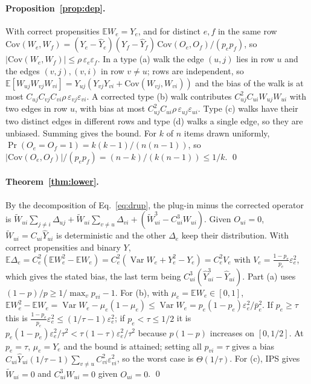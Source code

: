 \documentclass[preprint,review,12pt,authoryear]{elsarticle}
\theoremstyle{definition}
\newcommand{\E}{\mathbb{E}}
\newcommand{\Var}{\operatorname{Var}}
\newcommand{\tW}{\tilde W}
\begin{document}
\paragraph{Proposition~\ref{prop:dep}.}
With correct propensities $\E W_e=Y_e$, and for distinct $e,f$ in the same row
$\mathrm{Cov}(W_e,W_f)=(Y_e-\hat Y_e)(Y_f-\hat Y_f)\,\mathrm{Cov}(O_e,O_f)/(p_ep_f)$, so
$|\mathrm{Cov}(W_e,W_f)|\le\rho\,\varepsilon_e\varepsilon_f$. In a type (a) walk the edge $(u,j)$
lies in row $u$ and the edges $(v,j),(v,i)$ in row $v\ne u$; rows are independent,
so $\E[W_{uj}W_{vj}W_{vi}]=Y_{uj}(Y_{vj}Y_{vi}+\mathrm{Cov}(W_{vj},W_{vi}))$ and the bias of
the walk is at most $C_{uj}C_{vj}C_{vi}\rho\,\varepsilon_{vj}\varepsilon_{vi}$. A corrected type (b)
walk contributes $C_{uj}^2C_{ui}W_{uj}W_{ui}$ with two edges in row $u$, with bias
at most $C_{uj}^2C_{ui}\rho\,\varepsilon_{uj}\varepsilon_{ui}$. Type (c) walks have their two
distinct edges in different rows and type (d) walks a single edge, so they are
unbiased. Summing gives the bound. For $k$ of $n$ items drawn uniformly,
$\Pr(O_e=O_f=1)=k(k-1)/(n(n-1))$, so
$|\mathrm{Cov}(O_e,O_f)|/(p_ep_f)=(n-k)/(k(n-1))\le1/k$. \qed

\paragraph{Theorem~\ref{thm:lower}.}
By the decomposition of Eq.~\eqref{eq:drup}, the plug-in minus the corrected
operator is $\tW_{ui}\sum_{j\ne i}\Delta_{uj}+\tW_{ui}\sum_{v\ne u}\Delta_{vi}+(\tW_{ui}^3-C_{ui}^3W_{ui})$.
Given $O_{ui}=0$, $\tW_{ui}=C_{ui}\hat Y_{ui}$ is deterministic and the other
$\Delta_e$ keep their distribution. With correct propensities and binary $Y$,
$\E\Delta_e=C_e^2(\E W_e^2-\E W_e)=C_e^2(\Var W_e+Y_e^2-Y_e)=C_e^2V_e$ with
$V_e=\frac{1-p_e}{p_e}\varepsilon_e^2$, which gives the stated bias, the last term being
$C_{ui}^3(\hat Y_{ui}^3-\hat Y_{ui})$. Part (a) uses $(1-p)/p\ge1/\max_vp_{vi}-1$. For
(b), with $\mu_e=\E W_e\in[0,1]$, $\E W_e^2-\E W_e=\Var W_e-\mu_e(1-\mu_e)\le\Var W_e
=p_e(1-p_e)\varepsilon_e^2/\bar p_e^2$. If $p_e\ge\tau$ this is
$\frac{1-p_e}{p_e}\varepsilon_e^2\le(1/\tau-1)\varepsilon_e^2$; if $p_e<\tau\le1/2$ it is
$p_e(1-p_e)\varepsilon_e^2/\tau^2<\tau(1-\tau)\varepsilon_e^2/\tau^2$ because $p(1-p)$ increases on
$[0,1/2]$. At $p_e=\tau$, $\mu_e=Y_e$ and the bound is attained; setting all
$p_{vi}=\tau$ gives a bias $C_{ui}\hat Y_{ui}(1/\tau-1)\sum_{v\ne u}C_{vi}^2\varepsilon_{vi}^2$, so the
worst case is $\Theta(1/\tau)$. For (c), IPS gives $\tW_{ui}=0$ and $C_{ui}^3W_{ui}=0$
given $O_{ui}=0$. \qed
\end{document}
